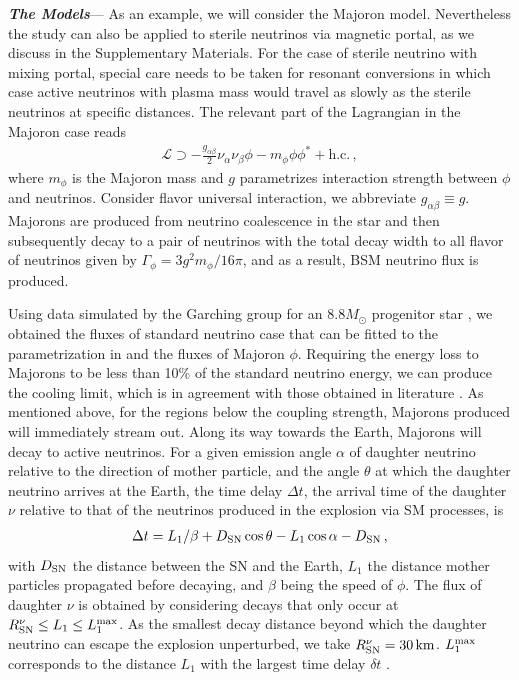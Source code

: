 \textbf{\textit{The Models}}---
As an example, we will consider the Majoron model. Nevertheless the study can also be applied to sterile neutrinos via magnetic portal, as we discuss in the Supplementary Materials. For the case of sterile neutrino with mixing portal, special care needs to be taken for resonant conversions in which case active neutrinos with plasma mass would travel as slowly as the sterile neutrinos at specific distances.
The relevant part of the Lagrangian in the Majoron case reads
\begin{align}
\mathcal{L} \supset -\frac{g_{\alpha\beta}}{2} \nu_\alpha \nu_\beta \phi - m_\phi \phi\phi^* + \text{h.c.}\,,
\end{align}
where $m_\phi$ is the Majoron mass and $g$ parametrizes interaction strength between $\phi$ and neutrinos. Consider flavor universal interaction, we abbreviate $g_{\alpha\beta}\equiv g$. Majorons are produced from neutrino coalescence in the star and then subsequently decay to a pair of neutrinos with the total decay width to all flavor of neutrinos given by $\Gamma_\phi = 3g^2 m_\phi/16 \pi$, and as a result, BSM neutrino flux is produced. 

Using data simulated by the Garching group for an $8.8 M_\odot$ progenitor star \cite{Huedepohl2010}, we obtained the fluxes of standard neutrino case that can be fitted to the parametrization in \cite{baxter2021snewpy} and the fluxes of Majoron $\phi$. Requiring the energy loss to Majorons to be less than 10\% of the standard neutrino energy, we can produce the cooling limit, which is in agreement with those obtained in literature \cite{Fiorillo:2022cdq}.
As mentioned above, for the regions below the coupling strength, Majorons produced will immediately stream out. Along its way towards the Earth, Majorons will decay to active neutrinos. For a given emission angle $\alpha$ of daughter neutrino relative to the direction of mother particle, and the angle $\theta$ at which the daughter neutrino arrives at the Earth, the time delay $\Delta t$, the arrival time of the daughter $\nu$ relative to that of the neutrinos produced in the explosion via SM processes, is \cite{Jaeckel:2017tud}
\begin{align}
    \Delta t = L_1/\beta + D_{\rm SN} \cos\theta-L_1 \cos\alpha -D_{\rm SN}\,,
    \label{eq:deltat}
\end{align}
with $D_{\rm SN}$ the distance between the SN and the Earth, $L_1$ the distance mother particles propagated before decaying, and $\beta$ being the speed of $\phi$. The flux of daughter $\nu$ is obtained by considering decays that only occur at $R^{\nu}_{\rm SN}\leq L_1 \leq L^{\rm max}_1$. As the smallest decay distance beyond which the daughter neutrino can escape the explosion unperturbed, we take $R^{\nu}_{\rm SN} = \unit[30]{km}$.
$L^{\rm max}_1$ corresponds to the distance $L_1$ with the largest time delay $\delta t$ \cite{Brdar:2023tmi}. 

